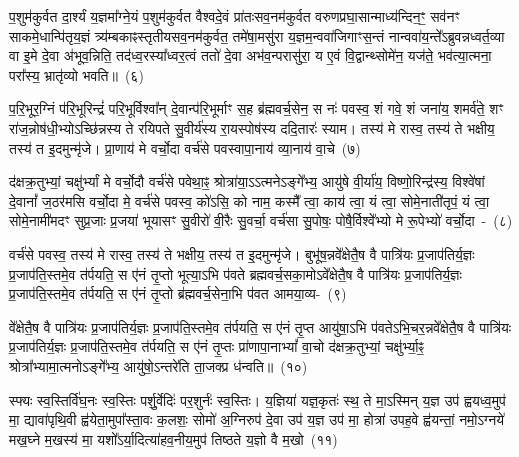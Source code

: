 प॒शुम॑कुर्वत दा॒र्श्यं य॒ज्ञमा᳚ग्ने॒यं प॒शुम॑कुर्वत वैश्वदे॒वं प्रा॑तःसव॒नम॑कुर्वत वरुण\-प्रघा॒सान्माध्य॑न्दिन॒ꣳ॒ सव॑नꣳ साक\-मे॒धान्पि॑तृय॒ज्ञं त्र्य॑म्बकाꣴस्तृतीय\-सव॒नम॑कुर्वत॒ तमे॑षा॒मसु॑रा य॒ज्ञम॒न्व\-वा॑जिगाꣳ\-स॒न्तं नान्ववा॑य॒न्ते᳚\-ऽब्रुवन्नध्वर्त॒व्या वा इ॒मे दे॒वा अ॑भूव॒न्निति॒ तद॑ध्व॒रस्या᳚ध्वर॒त्वं ततो॑ दे॒वा अभ॑व॒न्परासु॑रा॒ य ए॒वं वि॒द्वान्थ्सोमे॑न॒ यज॑ते॒ भव॑त्या॒त्मना॒ परा᳚स्य॒ भ्रातृ॑व्यो भवति॥~(६)\ip

{\anuvakamend[{अप॑श्यन्तो\-ऽग्नीषो॒मीय॑मा॒त्मना॒ परा॒ त्रीणि॑ च}]}

प॒रि॒भूर॒ग्निं प॑रि॒भूरिन्द्रं॑ परि॒भूर्विश्वा᳚न् दे॒वान्प॑रि॒भूर्माꣳ स॒ह ब्र॑ह्मवर्च॒सेन॒ स नः॑ पवस्व॒ शं गवे॒ शं जना॑य॒ शमर्व॑ते॒ शꣳ रा॑ज॒न्नोष॑धी॒भ्यो\-ऽच्छि॑न्नस्य ते रयिपते सु॒वीर्य॑स्य रा॒यस्पोष॑स्य ददि॒तारः॑ स्याम। तस्य॑ मे रास्व॒ तस्य॑ ते भक्षीय॒ तस्य॑ त इ॒दमुन्मृ॑जे। प्रा॒णाय॑ मे वर्चो॒दा वर्च॑से पवस्वापा॒नाय॑ व्या॒नाय॑ वा॒चे~(७)\ip

द॑क्षक्र॒तुभ्यां॒ चक्षु॑र्भ्यां मे वर्चो॒दौ वर्च॑से पवेथा॒ꣴ॒ श्रोत्रा॑या॒\-ऽऽ\-\-त्मने\-ऽङ्गे᳚भ्य॒ आयु॑षे वी॒र्या॑य॒ विष्णो॒रिन्द्र॑स्य॒ विश्वे॑षां दे॒वानां᳚ ज॒ठर॑मसि वर्चो॒दा मे॒ वर्च॑से पवस्व॒ को॑\-ऽसि॒ को नाम॒ कस्मै᳚ त्वा॒ काय॑ त्वा॒ यं त्वा॒ सोमे॒नाती॑तृपं॒ यं त्वा॒ सोमे॒नामी॑मदꣳ सुप्र॒जाः प्र॒जया॑ भूयासꣳ सु॒वीरो॑ वी॒रैः सु॒वर्चा॒ वर्च॑सा सु॒पोषः॒ पोषै॒र्विश्वे᳚भ्यो मे रू॒पेभ्यो॑ वर्चो॒दा~-~(८)\ip

वर्च॑से पवस्व॒ तस्य॑ मे रास्व॒ तस्य॑ ते भक्षीय॒ तस्य॑ त इ॒दमुन्मृ॑जे। बुभू॑ष॒न्नवे᳚क्षेतै॒ष वै पात्रि॑यः प्र॒जा\-प॑तिर्य॒ज्ञः प्र॒जा\-प॑ति॒स्तमे॒व त॑र्पयति॒ स ए॑नं तृ॒प्तो भूत्या॒\-ऽभि प॑वते ब्रह्मवर्च॒सका॒मो\-ऽवे᳚क्षेतै॒ष वै पात्रि॑यः प्र॒जा\-प॑तिर्य॒ज्ञः प्र॒जा\-प॑ति॒स्तमे॒व त॑र्पयति॒ स ए॑नं तृ॒प्तो ब्र॑ह्मवर्च॒सेना॒भि प॑वत आमया॒व्य-~(९)\ip

वे᳚क्षेतै॒ष वै पात्रि॑यः प्र॒जा\-प॑तिर्य॒ज्ञः प्र॒जा\-प॑ति॒स्तमे॒व त॑र्पयति॒ स ए॑नं तृ॒प्त आयु॑षा॒\-ऽभि प॑वते\-ऽभि॒चर॒न्नवे᳚क्षेतै॒ष वै पात्रि॑यः प्र॒जा\-प॑तिर्य॒ज्ञः प्र॒जा\-प॑ति॒स्तमे॒व त॑र्पयति॒ स ए॑नं तृ॒प्तः प्रा॑णापा॒ना\-भ्यां᳚ वा॒चो द॑क्षक्र॒तुभ्यां॒ चक्षु॑र्भ्या॒ꣴ॒ श्रोत्रा᳚भ्यामा॒त्मनो\-ऽङ्गे᳚भ्य॒ आयु॑षो॒\-ऽन्तरे॑ति ता॒जक्प्र ध॑न्वति॥~(१०)\ip

{\anuvakamend[{वा॒चे रू॒पेभ्यो॑ वर्चो॒दा आ॑मया॒वी पञ्च॑चत्वारिꣳशच्च}]}

स्फ्यः स्व॒स्तिर्वि॑घ॒नः स्व॒स्तिः पर्\mbox{}शु॒र्वेदिः॑ पर॒शुर्नः॑ स्व॒स्तिः। य॒ज्ञिया॑ यज्ञ॒कृतः॑ स्थ॒ ते मा॒\-ऽस्मिन् य॒ज्ञ उप॑ ह्वयध्व॒मुप॑ मा॒ द्यावा॑\-पृथि॒वी ह्व॑येता॒मुपा᳚स्ता॒वः क॒लशः॒ सोमो॑ अ॒ग्निरुप॑ दे॒वा उप॑ य॒ज्ञ उप॑ मा॒ होत्रा॑ उपह॒वे ह्व॑यन्तां॒ नमो॒\-ऽग्नये॑ मख॒घ्ने म॒खस्य॑ मा॒ यशो᳚\-ऽर्या॒दित्या॑हव॒नीय॒मुप॑ तिष्ठते य॒ज्ञो वै म॒खो~(११)\ip

